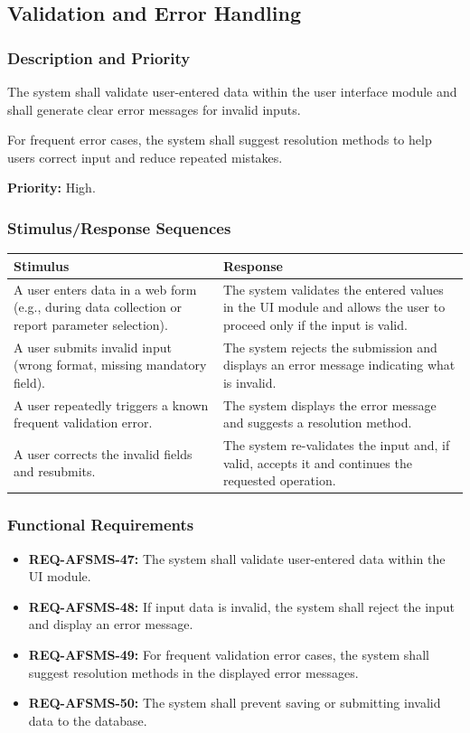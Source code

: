 \documentclass[11pt, a4paper]{article}
\begin{document}
\subsection{Validation and Error Handling}
\subsubsection{Description and Priority}
The system shall validate user-entered data within the user interface module and shall generate clear error messages for invalid inputs.

For frequent error cases, the system shall suggest resolution methods to help users correct input and reduce repeated mistakes.

\textbf{Priority:} High.

\subsubsection{Stimulus/Response Sequences}
\begin{table}[H]
\begin{tabularx}{\textwidth}{>{\raggedright\arraybackslash}p{3.2cm} >{\raggedright\arraybackslash}X}
\toprule
\textbf{Stimulus} & \textbf{Response} \\
\midrule
A user enters data in a web form (e.g., during data collection or report parameter selection). & The system validates the entered values in the UI module and allows the user to proceed only if the input is valid. \\
\midrule
A user submits invalid input (wrong format, missing mandatory field). & The system rejects the submission and displays an error message indicating what is invalid. \\
\midrule
A user repeatedly triggers a known frequent validation error. & The system displays the error message and suggests a resolution method. \\
\midrule
A user corrects the invalid fields and resubmits. & The system re-validates the input and, if valid, accepts it and continues the requested operation. \\
\bottomrule
\end{tabularx}
\end{table}

\subsubsection{Functional Requirements}
\begin{itemize}
    \item \textbf{REQ-AFSMS-47:} The system shall validate user-entered data within the UI module.
    \item \textbf{REQ-AFSMS-48:} If input data is invalid, the system shall reject the input and display an error message.
    \item \textbf{REQ-AFSMS-49:} For frequent validation error cases, the system shall suggest resolution methods in the displayed error messages.
    \item \textbf{REQ-AFSMS-50:} The system shall prevent saving or submitting invalid data to the database.
\end{itemize}
\end{document}
